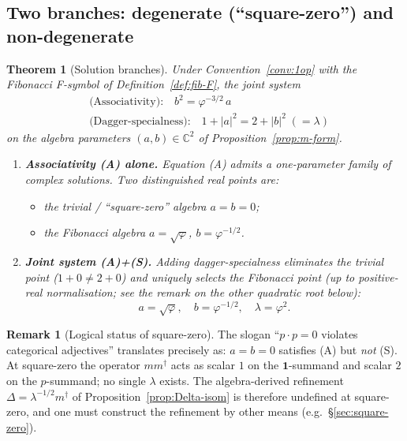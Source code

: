 \documentclass[11pt,a4paper]{article}
\newtheorem{theorem}[definition]{Theorem}
\theoremstyle{definition}
\newtheorem{remark}[definition]{Remark}
\newcommand{\one}{\mathbf{1}}
\begin{document}
\subsection{Two branches: degenerate (``square-zero'') and non-degenerate}\label{sec:branches}

\begin{theorem}[Solution branches]\label{thm:branches}
Under Convention~\ref{conv:1op} with the Fibonacci F-symbol of
Definition~\ref{def:fib-F}, the joint system
\begin{align*}
&\text{(Associativity):}\quad b^{2} = \varphi^{-3/2}\,a
\tag{A}\\
&\text{(Dagger-specialness):}\quad 1 + |a|^{2} = 2 + |b|^{2} \;(=\lambda)
\tag{S}
\end{align*}
on the algebra parameters $(a,b)\in\mathbb{C}^{2}$ of
Proposition~\ref{prop:m-form}.
\begin{enumerate}[label=(\alph*)]
\item \textbf{Associativity (A) alone.} Equation (A) admits a
      one-parameter family of complex solutions. Two distinguished
      real points are:
      \begin{itemize}
      \item the \emph{trivial / ``square-zero''} algebra $a=b=0$;
      \item the \emph{Fibonacci} algebra $a=\sqrt\varphi$, $b=\varphi^{-1/2}$.
      \end{itemize}
\item \textbf{Joint system (A)+(S).} Adding dagger-specialness
      \emph{eliminates} the trivial point ($1+0\ne 2+0$) and uniquely
      selects the Fibonacci point (up to positive-real normalisation; see
      the remark on the other quadratic root below):
      \[
      a = \sqrt\varphi,\quad b = \varphi^{-1/2},\quad \lambda = \varphi^{2}.
      \]
\end{enumerate}
\end{theorem}

\begin{remark}[Logical status of square-zero]\label{rem:sq-zero-status}
The slogan ``$p\cdot p = 0$ violates categorical adjectives'' translates
precisely as: $a = b = 0$ satisfies (A) but \emph{not} (S). At square-zero
the operator $mm^{\dagger}$ acts as scalar $1$ on the $\one$-summand and
scalar $2$ on the $p$-summand; no single $\lambda$ exists. The
algebra-derived refinement $\Delta = \lambda^{-1/2}m^{\dagger}$ of
Proposition~\ref{prop:Delta-isom} is therefore undefined at square-zero,
and one must construct the refinement by other means (e.g.\
\S\ref{sec:square-zero}).
\end{remark}
\end{document}
